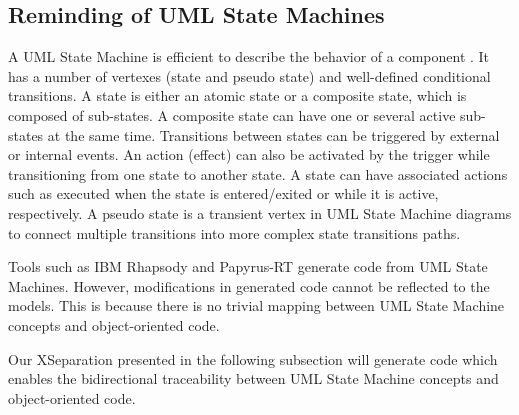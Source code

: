 \subsection{Reminding of UML State Machines} 
A UML State Machine is efficient to describe the behavior of a component \cite{possepapyrusrt, Ringert2013}.
It has a number of vertexes (state and pseudo state) and well-defined conditional transitions. 
A state is either an atomic state or a composite state, which is composed of sub-states. 
A composite state can have one or several active sub-states at the same time. %
Transitions between states can be triggered by external or internal events. 
An action (effect) can also be activated by the trigger while transitioning from one state to another state. 
A state can have associated actions such as  executed when the state is entered/exited or while it is active, respectively. 
A pseudo state is a transient vertex in UML State Machine diagrams to connect multiple transitions into more complex state transitions paths.

Tools such as IBM Rhapsody \cite{ibm_rhapsody} and Papyrus-RT \cite{possepapyrusrt} generate code from UML State Machines. 
However, modifications in generated code cannot be reflected to the models.
This is because there is no trivial mapping between UML State Machine concepts and object-oriented code.

Our XSeparation presented in the following subsection will generate code which enables the bidirectional traceability between UML State Machine concepts and object-oriented code.

	
